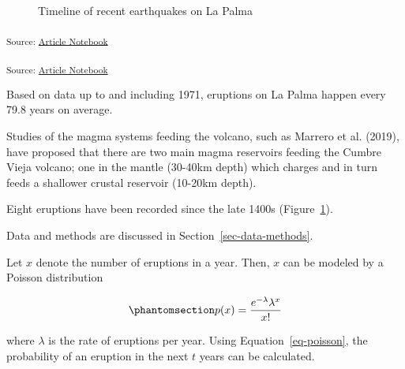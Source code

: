\documentclass[
]{agujournal2019}
\begin{document}
\label{cell-fig-timeline}
\begin{figure}[H]


\caption{\label{fig-timeline}Timeline of recent earthquakes on La Palma}

\end{figure}%

\textsubscript{Source:
\href{https://tiernanmartin.github.io/2024-transit-oriented-development-bill/index-preview.html}{Article
Notebook}}

\textsubscript{Source:
\href{https://tiernanmartin.github.io/2024-transit-oriented-development-bill/index-preview.html}{Article
Notebook}}

Based on data up to and including 1971, eruptions on La Palma happen
every 79.8 years on average.

Studies of the magma systems feeding the volcano, such as Marrero et al.
(2019), have proposed that there are two main magma reservoirs feeding
the Cumbre Vieja volcano; one in the mantle (30-40km depth) which
charges and in turn feeds a shallower crustal reservoir (10-20km depth).

Eight eruptions have been recorded since the late 1400s
(Figure~\ref{fig-timeline}).

Data and methods are discussed in Section~\ref{sec-data-methods}.

Let \(x\) denote the number of eruptions in a year. Then, \(x\) can be
modeled by a Poisson distribution

\begin{equation}\phantomsection\label{eq-poisson}{
p(x) = \frac{e^{-\lambda} \lambda^{x}}{x !}
}\end{equation}

where \(\lambda\) is the rate of eruptions per year. Using
Equation~\ref{eq-poisson}, the probability of an eruption in the next
\(t\) years can be calculated.
\end{document}
